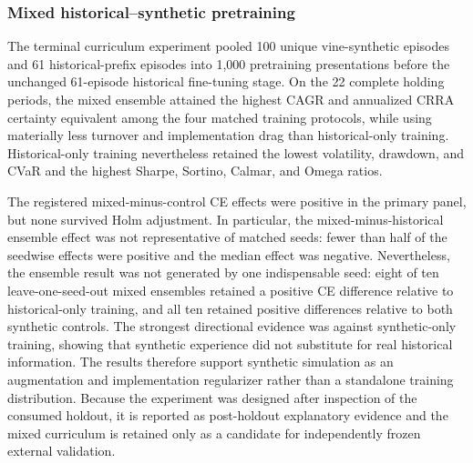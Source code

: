 \subsubsection{Mixed historical--synthetic pretraining}
The terminal curriculum experiment pooled 100 unique vine-synthetic episodes and 61 historical-prefix episodes into 1,000 pretraining presentations before the unchanged 61-episode historical fine-tuning stage.  On the 22 complete holding periods, the mixed ensemble attained the highest CAGR and annualized CRRA certainty equivalent among the four matched training protocols, while using materially less turnover and implementation drag than historical-only training.  Historical-only training nevertheless retained the lowest volatility, drawdown, and CVaR and the highest Sharpe, Sortino, Calmar, and Omega ratios.

The registered mixed-minus-control CE effects were positive in the primary panel, but none survived Holm adjustment.  In particular, the mixed-minus-historical ensemble effect was not representative of matched seeds: fewer than half of the seedwise effects were positive and the median effect was negative.  Nevertheless, the ensemble result was not generated by one indispensable seed: eight of ten leave-one-seed-out mixed ensembles retained a positive CE difference relative to historical-only training, and all ten retained positive differences relative to both synthetic controls.  The strongest directional evidence was against synthetic-only training, showing that synthetic experience did not substitute for real historical information.  The results therefore support synthetic simulation as an augmentation and implementation regularizer rather than a standalone training distribution.  Because the experiment was designed after inspection of the consumed holdout, it is reported as post-holdout explanatory evidence and the mixed curriculum is retained only as a candidate for independently frozen external validation.
